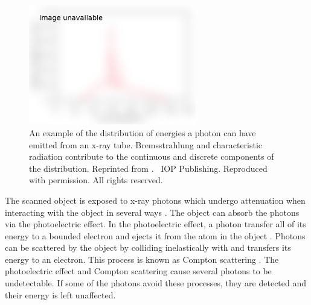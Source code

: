 \begin{figure}
  \centering
  \includegraphics[width=0.65\textwidth]{../figures/literatureReview/literature_spectrum.png}
  \caption{An example of the distribution of energies a photon can have emitted from an x-ray tube. Bremsstrahlung and characteristic radiation contribute to the continuous and discrete components of the distribution. Reprinted from \cite{michael2001x}. \textcopyright\ IOP Publishing. Reproduced with permission. All rights reserved.}
  \label{fig:literature_spectrum}
\end{figure}

The scanned object is exposed to x-ray photons which undergo attenuation when interacting with the object in several ways \citep{cantatore2011introduction}. The object can absorb the photons via the photoelectric effect. In the photoelectric effect, a photon transfer all of its energy to a bounded electron and ejects it from the atom in the object \citep{millikan1916direct}. Photons can be scattered by the object by colliding inelastically with and transfers its energy to an electron. This process is known as Compton scattering \citep{compton1923quantum}. The photoelectric effect and Compton scattering cause several photons to be undetectable. If some of the photons avoid these processes, they are detected and their energy is left unaffected.

